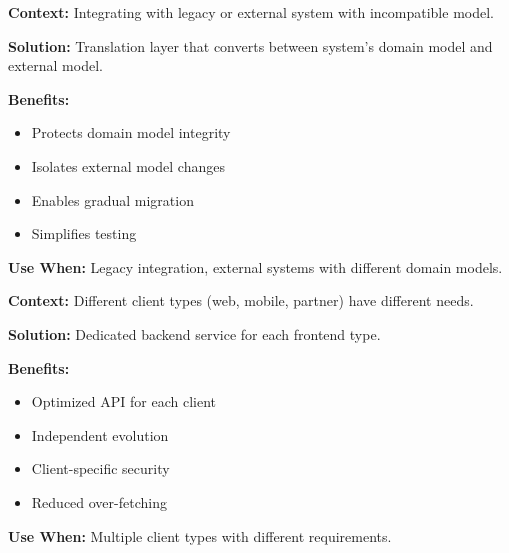 \documentclass[11pt,letterpaper]{article}
\begin{document}
\begin{patternbox}
\textbf{Context:} Integrating with legacy or external system with incompatible model.

\textbf{Solution:} Translation layer that converts between system's domain model and external model.

\textbf{Benefits:}
\begin{itemize}[nosep]
    \item Protects domain model integrity
    \item Isolates external model changes
    \item Enables gradual migration
    \item Simplifies testing
\end{itemize}

\textbf{Use When:} Legacy integration, external systems with different domain models.
\end{patternbox}

\begin{patternbox}
\textbf{Context:} Different client types (web, mobile, partner) have different needs.

\textbf{Solution:} Dedicated backend service for each frontend type.

\textbf{Benefits:}
\begin{itemize}[nosep]
    \item Optimized API for each client
    \item Independent evolution
    \item Client-specific security
    \item Reduced over-fetching
\end{itemize}

\textbf{Use When:} Multiple client types with different requirements.
\end{patternbox}
\end{document}
